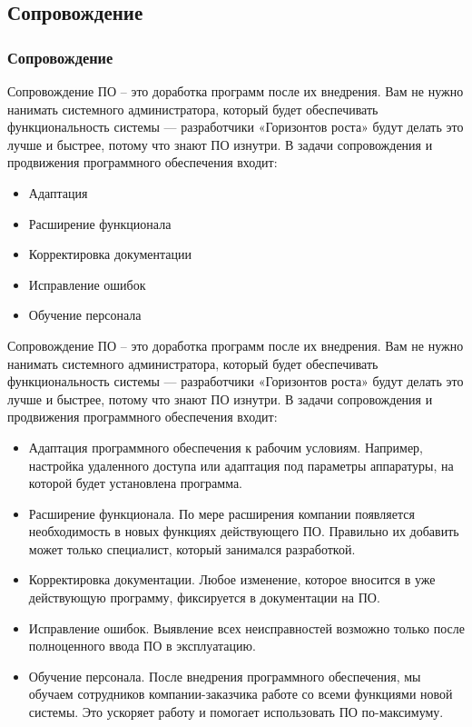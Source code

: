 \documentclass{../industrial-development}
\begin{document}
\subsection{Сопровождение}
\begin{frame} \frametitle{Сопровождение}
Сопровождение ПО – это доработка программ после их внедрения. Вам не нужно нанимать системного администратора, который будет обеспечивать функциональность системы --- разработчики «Горизонтов роста» будут делать это лучше и быстрее, потому что знают ПО изнутри. В задачи сопровождения и продвижения программного обеспечения входит:
\begin{itemize}
\item Адаптация
\item Расширение функционала
\item Корректировка документации
\item Исправление ошибок
\item Обучение персонала
\end{itemize}
\end{frame}
\lecturenotes
Сопровождение ПО – это доработка программ после их внедрения. Вам не нужно нанимать системного администратора, который будет обеспечивать функциональность системы --- разработчики «Горизонтов роста» будут делать это лучше и быстрее, потому что знают ПО изнутри. В задачи сопровождения и продвижения программного обеспечения входит:\\
\begin{itemize}
	\item Адаптация программного обеспечения к рабочим условиям. Например, настройка удаленного доступа или адаптация под параметры аппаратуры, на которой будет установлена программа.
	\item Расширение функционала. По мере расширения компании появляется необходимость в новых функциях действующего ПО. Правильно их добавить может только специалист, который занимался разработкой.
	\item Корректировка документации. Любое изменение, которое вносится в уже действующую программу, фиксируется в документации на ПО.
	\item Исправление ошибок. Выявление всех неисправностей возможно только после полноценного ввода ПО в эксплуатацию.
	\item Обучение персонала. После внедрения программного обеспечения, мы обучаем сотрудников компании-заказчика работе со всеми функциями новой системы. Это ускоряет работу и помогает использовать ПО по-максимуму. 
\end{itemize}
\end{document}
